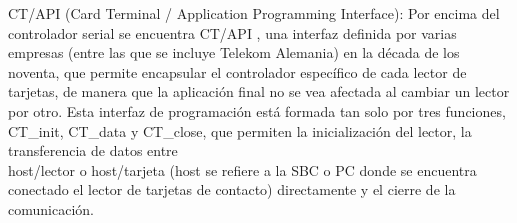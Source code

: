 \documentclass[%
        final,
        notitlepage,
        narroweqnarray,
        inline,
        ]{ieee}
\begin{document}


CT/API (Card Terminal / Application Programming Interface):
Por encima del controlador serial se encuentra CT/API \cite{ctapi}, una interfaz definida por varias empresas (entre las que se incluye Telekom Alemania) en la década de los noventa, que permite encapsular el controlador específico de cada lector de tarjetas, de manera que la aplicación final no se vea afectada al cambiar un lector por otro.
Esta interfaz de programación está formada tan solo por tres funciones, CT\_init, CT\_data y CT\_close, que permiten la inicialización del lector, la transferencia de datos entre \\
host/lector o host/tarjeta (host se refiere a la SBC o PC donde se encuentra conectado el lector de tarjetas de contacto) directamente y el cierre de la comunicación.\\
%
%
\end{document}

